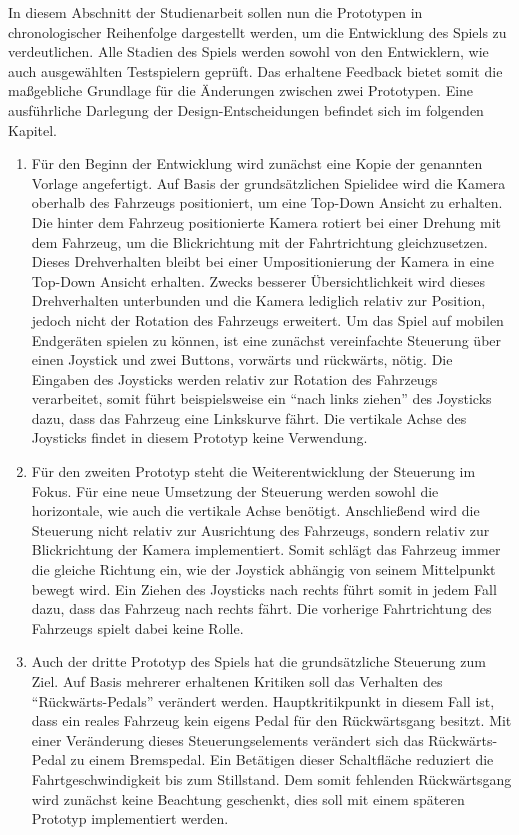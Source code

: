 	In diesem Abschnitt der Studienarbeit sollen nun die Prototypen in chronologischer Reihenfolge dargestellt werden, um die Entwicklung des Spiels zu verdeutlichen. Alle Stadien des Spiels werden sowohl von den Entwicklern, wie auch ausgewählten Testspielern geprüft. Das erhaltene Feedback bietet somit die maßgebliche Grundlage für die Änderungen zwischen zwei Prototypen. Eine ausführliche Darlegung der Design-Entscheidungen befindet sich im folgenden Kapitel.
	\begin{enumerate}[itemindent=*,label=\textbf{Prototyp \arabic*}]
		\item{ Für den Beginn der Entwicklung wird zunächst eine Kopie der genannten Vorlage angefertigt. Auf Basis der grundsätzlichen Spielidee wird die Kamera oberhalb des Fahrzeugs positioniert, um eine Top-Down Ansicht zu erhalten. Die hinter dem Fahrzeug positionierte Kamera rotiert bei einer Drehung mit dem Fahrzeug, um die Blickrichtung mit der Fahrtrichtung gleichzusetzen. Dieses Drehverhalten bleibt bei einer Umpositionierung der Kamera in eine Top-Down Ansicht erhalten. Zwecks besserer Übersichtlichkeit wird dieses Drehverhalten unterbunden und die Kamera lediglich relativ zur Position, jedoch nicht der Rotation des Fahrzeugs erweitert. Um das Spiel auf mobilen Endgeräten spielen zu können, ist eine zunächst vereinfachte Steuerung über einen Joystick und zwei Buttons, vorwärts und rückwärts, nötig. Die Eingaben des Joysticks werden relativ zur Rotation des Fahrzeugs verarbeitet, somit führt beispielsweise ein \enquote{nach links ziehen} des Joysticks dazu, dass das Fahrzeug eine Linkskurve fährt. Die vertikale Achse des Joysticks findet in diesem Prototyp keine Verwendung. }
		\item{ Für den zweiten Prototyp steht die Weiterentwicklung der Steuerung im Fokus. Für eine neue Umsetzung der Steuerung werden sowohl die horizontale, wie auch die vertikale Achse benötigt. Anschließend wird die Steuerung nicht relativ zur Ausrichtung des Fahrzeugs, sondern relativ zur Blickrichtung der Kamera implementiert. Somit schlägt das Fahrzeug immer die gleiche Richtung ein, wie der Joystick abhängig von seinem Mittelpunkt bewegt wird. Ein Ziehen des Joysticks nach rechts führt somit in jedem Fall dazu, dass das Fahrzeug nach rechts fährt. Die vorherige Fahrtrichtung des Fahrzeugs spielt dabei keine Rolle. }
		\item{ Auch der dritte Prototyp des Spiels hat die grundsätzliche Steuerung zum Ziel. Auf Basis mehrerer erhaltenen Kritiken soll das Verhalten des \enquote{Rückwärts-Pedals} verändert werden. Hauptkritikpunkt in diesem Fall ist, dass ein reales Fahrzeug kein eigens Pedal für den Rückwärtsgang besitzt. Mit einer Veränderung dieses Steuerungselements verändert sich das Rückwärts-Pedal zu einem Bremspedal. Ein Betätigen dieser Schaltfläche reduziert die Fahrtgeschwindigkeit bis zum Stillstand. Dem somit fehlenden Rückwärtsgang wird zunächst keine Beachtung geschenkt, dies soll mit einem späteren Prototyp implementiert werden.}

\end{enumerate}
